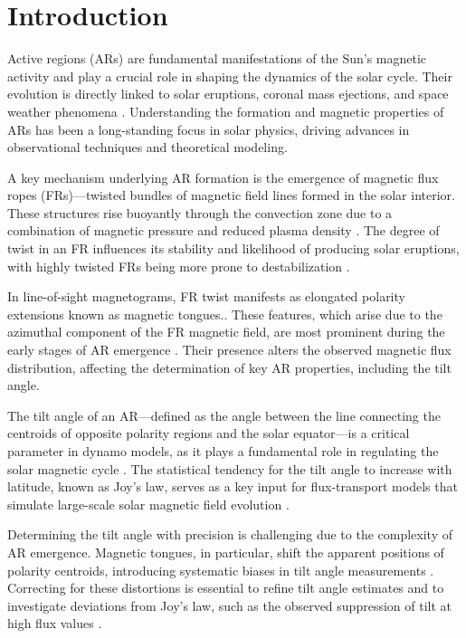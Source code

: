 \documentclass[namedreferences,hyperref,optionalrh]{spr-sola}
\begin{document}
\section{Introduction}
     \label{S-Introduction} 
     
Active regions (ARs) are fundamental manifestations of the Sun’s magnetic activity and play a crucial role in shaping the dynamics of the solar cycle. Their evolution is directly linked to solar eruptions, coronal mass ejections, and space weather phenomena \citep{schrijver2000, toriumi2019}. Understanding the formation and magnetic properties of ARs has been a long-standing focus in solar physics, driving advances in observational techniques and theoretical modeling.

A key mechanism underlying AR formation is the emergence of magnetic flux ropes (FRs)—twisted bundles of magnetic field lines formed in the solar interior. These structures rise buoyantly through the convection zone due to a combination of magnetic pressure and reduced plasma density \citep{fan2001, cheung2014}. The degree of twist in an FR influences its stability and likelihood of producing solar eruptions, with highly twisted FRs being more prone to destabilization \citep{liu2016, torok2018}.

In line-of-sight magnetograms, FR twist manifests as elongated polarity extensions known as magnetic tongues.. These features, which arise due to the azimuthal component of the FR magnetic field, are most prominent during the early stages of AR emergence \citep{luoni2011, Poisson16}. Their presence alters the observed magnetic flux distribution, affecting the determination of key AR properties, including the tilt angle.

The tilt angle of an AR—defined as the angle between the line connecting the centroids of opposite polarity regions and the solar equator—is a critical parameter in dynamo models, as it plays a fundamental role in regulating the solar magnetic cycle \citep{stenflo2012}. The statistical tendency for the tilt angle to increase with latitude, known as Joy’s law, serves as a key input for flux-transport models that simulate large-scale solar magnetic field evolution \citep{Hale19, dasi2010, Yeates2023}.

Determining the tilt angle with precision is challenging due to the complexity of AR emergence. Magnetic tongues, in particular, shift the apparent positions of polarity centroids, introducing systematic biases in tilt angle measurements \citep{Poisson22}. Correcting for these distortions is essential to refine tilt angle estimates and to investigate deviations from Joy’s law, such as the observed suppression of tilt at high flux values \citep{jiang2020}.
\end{document}
